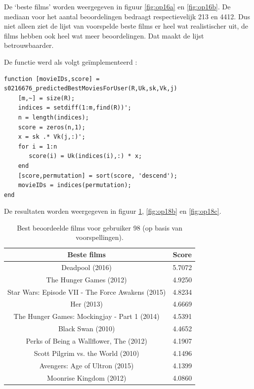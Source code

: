 \restoregeometry

\newpage
{}

De `beste films' worden weergegeven in figuur \ref{fig:op16a} en \ref{fig:op16b}. De mediaan voor het aantal beoordelingen bedraagt respectievelijk 213 en 4412. Dus niet alleen ziet de lijst van voorspelde beste films er heel wat realistischer uit, de films hebben ook heel wat meer beoordelingen. Dat maakt de lijst betrouwbaarder.



De functie werd als volgt ge\"implementeerd :

\begin{lstlisting}
function [movieIDs,score] = s0216676_predictedBestMoviesForUser(R,Uk,sk,Vk,j)
    [m,~] = size(R);
    indices = setdiff(1:m,find(R))';
    n = length(indices);
    score = zeros(n,1);
    x = sk .* Vk(j,:)';
    for i = 1:n
       score(i) = Uk(indices(i),:) * x;
    end
    [score,permutation] = sort(score, 'descend');
    movieIDs = indices(permutation);
end
\end{lstlisting}



De resultaten worden weergegeven in figuur \ref{fig:op18a}, \ref{fig:op18b} en \ref{fig:op18c}.


\begin{table}[H]
\centering
\begin{tabular}{c|c}
\textbf{Beste films} & \textbf{Score} \\
\hline
    Deadpool (2016)                                   & 5.7072 \\
    The Hunger Games (2012)                           & 4.9250 \\
    Star Wars: Episode VII - The Force Awakens (2015) & 4.8234 \\
    Her (2013)                                        & 4.6669 \\
    The Hunger Games: Mockingjay - Part 1 (2014)      & 4.5391 \\
    Black Swan (2010)                                 & 4.4652 \\
    Perks of Being a Wallflower, The (2012)           & 4.1907 \\
    Scott Pilgrim vs. the World (2010)                & 4.1496 \\
    Avengers: Age of Ultron (2015)                    & 4.1399 \\
    Moonrise Kingdom (2012)                           & 4.0860 
\end{tabular}
\caption{Best beoordeelde films voor gebruiker 98 (op basis van voorspellingen).}
\label{fig:op18a}
\end{table}

